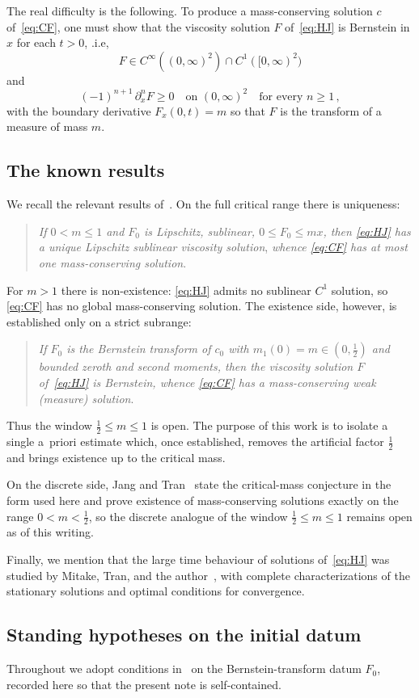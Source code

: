\documentclass[12pt]{amsart}
\numberwithin{equation}{section}
\theoremstyle{plain}
\theoremstyle{definition}
\renewcommand{\d}{\partial}
\begin{document}
The real difficulty is the following.
To produce a mass-conserving solution $c$ of~\eqref{eq:CF},
one must show that the viscosity solution $F$ of~\eqref{eq:HJ}
is Bernstein in $x$ for each $t>0$, .i.e,
\[
	F\in C^\infty((0,\infty)^2)\cap C^1([0,\infty)^2)
\]
and
\[
	(-1)^{n+1}\,\d_x^n F\ge0\quad\text{on }(0,\infty)^2\quad\text{for
		every }n\ge1 \, ,
\]
with the boundary derivative $F_x (0,t) = m$ so that $F$ is the transform of a measure of mass $m$.

\subsection{The known results}
We recall the relevant results of~\cite{TV}. On the full critical range there is uniqueness:
\begin{quote}
	\emph{If $0<m\le1$ and $F_0$ is Lipschitz, sublinear, $0\le F_0\le mx$, then
		\eqref{eq:HJ} has a unique Lipschitz sublinear viscosity solution},
	\emph{whence \eqref{eq:CF} has at most one mass-conserving
		solution}.
\end{quote}
For $m>1$ there is non-existence: \eqref{eq:HJ} admits no sublinear
$C^1$ solution, so \eqref{eq:CF} has no global mass-conserving
solution.
The existence side, however, is established only on a strict
subrange:
\begin{quote}
	\emph{If $F_0$ is the Bernstein transform of $c_0$ with
		$m_1(0)=m\in(0,\tfrac12)$
		and bounded zeroth and second moments, then the viscosity solution $F$ of~\eqref{eq:HJ}
		is Bernstein,
		whence \eqref{eq:CF} has a
		mass-conserving
		weak (measure) solution}.
\end{quote}
Thus the window $\tfrac12\le m\le1$ is open.
The purpose of this work is to
isolate a single a~priori estimate which, once established, removes the
artificial factor $\tfrac12$ and brings existence up to the critical mass.

On the
discrete side, Jang and Tran~\cite{JangTran} state the critical-mass
conjecture in the form used here and prove existence of mass-conserving
solutions exactly on the range $0<m<\tfrac12$, so the discrete analogue of the
window $\tfrac12\le m\le1$ remains open as of this writing.

Finally, we mention that the large time behaviour of solutions
of~\eqref{eq:HJ} was studied by Mitake, Tran, and the author~\cite{MTV}, with
complete characterizations of the stationary solutions and optimal conditions
for convergence.

\subsection{Standing hypotheses on the initial datum}
Throughout we adopt conditions in~\cite{TV} on the Bernstein-transform datum
$F_0$, recorded here so that the present note is self-contained.
\end{document}
